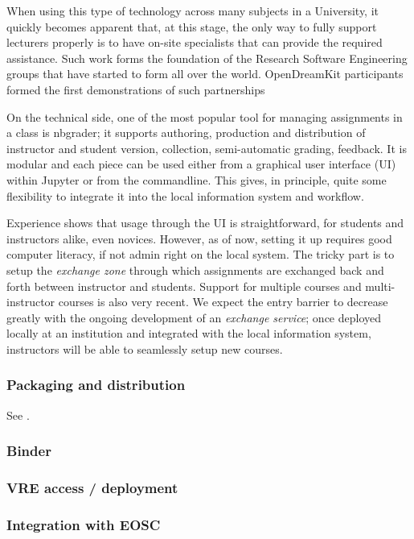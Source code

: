 \documentclass{deliverablereport}
\begin{document}
When using this type of technology across many subjects in a
University, it quickly becomes apparent that, at this stage, the only
way to fully support lecturers properly is to have on-site specialists
that can provide the required assistance. Such work forms the
foundation of the Research Software Engineering groups that have
started to form all over the world. OpenDreamKit participants formed
the first demonstrations of such partnerships

On the technical side, one of the most popular tool for managing
assignments in a class is nbgrader; it supports authoring,
production and distribution of instructor and student version,
collection, semi-automatic grading, feedback. It is modular and each
piece can be used either from a graphical user interface (UI) within
Jupyter or from the commandline. This gives, in principle, quite some
flexibility to integrate it into the local information system and
workflow.

Experience shows that usage through the UI is straightforward, for
students and instructors alike, even novices. However, as of now,
setting it up requires good computer literacy, if not admin right on the
local system. The tricky part is to setup the \emph{exchange zone}
through which assignments are exchanged back and forth between
instructor and students. Support for multiple courses and
multi-instructor courses is also very recent. We expect the entry
barrier to decrease greatly with the ongoing development of an
\emph{exchange service}; once deployed locally at an institution and
integrated with the local information system, instructors will be able
to seamlessly setup new courses.

\subsubsection{Packaging and distribution}

See .

\subsubsection{Binder}

\subsubsection{VRE access / deployment}

\subsubsection{Integration with EOSC}
\end{document}

